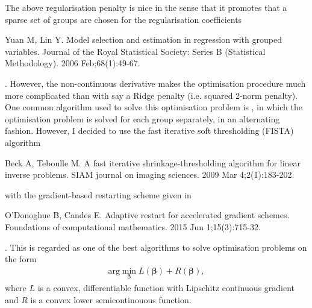 \documentclass[letterpaper,10pt,english]{sphinxmanual}
\begin{document}
The above regularisation penalty is nice in the sense that it promotes that a
sparse set of groups are chosen for the regularisation coefficients %
\begin{footnote}[1]\sphinxAtStartFootnote
Yuan M, Lin Y. Model selection and estimation in regression with
grouped variables. Journal of the Royal Statistical Society: Series B
(Statistical Methodology). 2006 Feb;68(1):49-67.
%
\end{footnote}.
However, the non-continuous derivative makes the optimisation procedure much
more complicated than with say a Ridge penalty (i.e. squared 2-norm penalty).
One common algorithm used to solve this optimisation problem is
, in which the optimisation problem is solved for
each group separately, in an alternating fashion. However, I decided to use
the fast iterative soft thresholding (FISTA) algorithm %
\begin{footnote}[2]\sphinxAtStartFootnote
Beck A, Teboulle M. A fast iterative shrinkage-thresholding algorithm
for linear inverse problems. SIAM journal on imaging sciences.
2009 Mar 4;2(1):183-202.
%
\end{footnote} with the
gradient-based restarting scheme given in %
\begin{footnote}[3]\sphinxAtStartFootnote
O’Donoghue B, Candes E. Adaptive restart for accelerated gradient
schemes. Foundations of computational mathematics.
2015 Jun 1;15(3):715-32.
%
\end{footnote}. This is regarded as one of the
best algorithms to solve optimisation problems on the form
\begin{equation*}
\begin{split}\text{arg} \min_{\mathbf{\beta}} L(\mathbf{\beta}) + R(\mathbf{\beta}),\end{split}
\end{equation*}
where \(L\) is a convex, differentiable function with Lipschitz continuous
gradient and \(R\) is a convex lower semicontinouous function.
\end{document}
